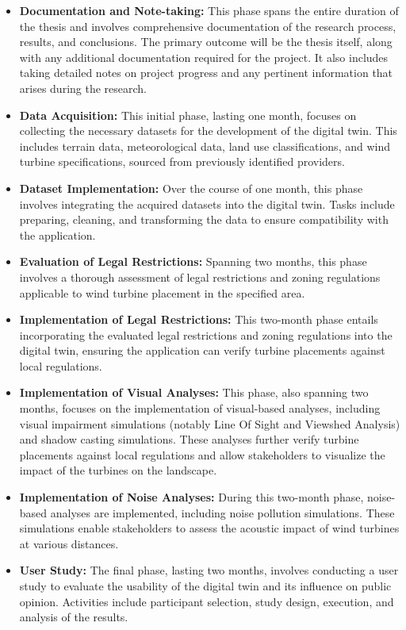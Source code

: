 \documentclass[11pt, titlepage, a4paper]{article}
\begin{document}
\begin{linenumbers}
    \begin{itemize}
        \item \textbf{Documentation and Note-taking:} This phase spans the entire duration of the thesis and involves comprehensive documentation of the research process, results, and conclusions. The primary outcome will be the thesis itself, along with any additional documentation required for the project. It also includes taking detailed notes on project progress and any pertinent information that arises during the research.
        \item \textbf{Data Acquisition:} This initial phase, lasting one month, focuses on collecting the necessary datasets for the development of the digital twin. This includes terrain data, meteorological data, land use classifications, and wind turbine specifications, sourced from previously identified providers.
        \item \textbf{Dataset Implementation:} Over the course of one month, this phase involves integrating the acquired datasets into the digital twin. Tasks include preparing, cleaning, and transforming the data to ensure compatibility with the application.
        \item \textbf{Evaluation of Legal Restrictions:} Spanning two months, this phase involves a thorough assessment of legal restrictions and zoning regulations applicable to wind turbine placement in the specified area.
        \item \textbf{Implementation of Legal Restrictions:} This two-month phase entails incorporating the evaluated legal restrictions and zoning regulations into the digital twin, ensuring the application can verify turbine placements against local regulations.
        \item \textbf{Implementation of Visual Analyses:} This phase, also spanning two months, focuses on the implementation of visual-based analyses, including visual impairment simulations (notably Line Of Sight and Viewshed Analysis) and shadow casting simulations. These analyses further verify turbine placements against local regulations and allow stakeholders to visualize the impact of the turbines on the landscape.
        \item \textbf{Implementation of Noise Analyses:} During this two-month phase, noise-based analyses are implemented, including noise pollution simulations. These simulations enable stakeholders to assess the acoustic impact of wind turbines at various distances.
        \item \textbf{User Study:} The final phase, lasting two months, involves conducting a user study to evaluate the usability of the digital twin and its influence on public opinion. Activities include participant selection, study design, execution, and analysis of the results.
    \end{itemize}


\end{linenumbers}
\clearpage
\printbibliography
\end{document}
